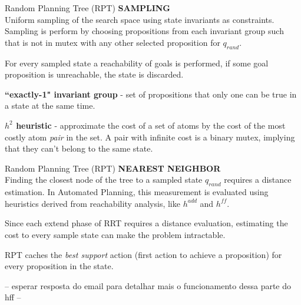 \documentclass[10pt, xcolor=table]{beamer}
\begin{document}

\begin{frame}{Random Planning Tree (RPT)}
\justify
\textbf{\large\alert{SAMPLING}}\\[0.3cm]
Uniform sampling of the search space using \alert{state invariants as constraints}. Sampling is perform by choosing propositions from each invariant group such that is not in mutex with any other selected proposition for $q_{rand}$.

For every sampled state a reachability of goals is performed, if some goal proposition is unreachable, the state is discarded.

\textbf{``exactly-1" invariant group} - set of propositions that only one can be true in a state at the same time.

\textbf{$h^2$ heuristic} - approximate the cost of a set of atoms by the cost of the most costly atom \textit{pair} in the set. A pair with infinite cost is a binary mutex, implying that they can't belong to the same state. 
\end{frame}

\begin{frame}{Random Planning Tree (RPT)}
\justify
\textbf{\large\alert{NEAREST NEIGHBOR}}\\[0.3cm]
Finding the closest node of the tree to a sampled state $q_{rand}$ requires a distance estimation. In Automated Planning, this measurement is evaluated using heuristics derived from reachability analysis, like $h^{add}$ and $h^{ff}$.

Since each extend phase of RRT requires a distance evaluation, estimating the cost to every sample state can make the problem intractable. 

RPT caches the \textit{best support} action (first action to achieve a proposition) for every proposition in the state. 

-- esperar resposta do email para detalhar mais o funcionamento dessa parte do hff --
\end{frame}
\end{document}
